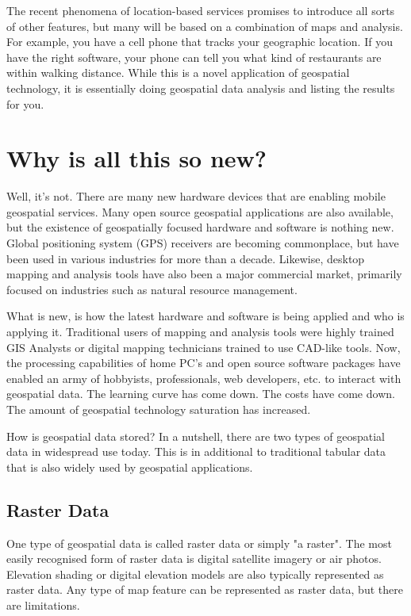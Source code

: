 The recent phenomena of location-based services promises to introduce all
sorts of other features, but many will be based on a combination of maps and
analysis. For example, you have a cell phone that tracks your geographic
location. If you have the right software, your phone can tell you what kind of
restaurants are within walking distance. While this is a novel application of
geospatial technology, it is essentially doing geospatial data analysis and
listing the results for you.

\section{Why is all this so new?}
Well, it's not. There are many new hardware devices that are enabling mobile
geospatial services. Many open source geospatial applications are also
available, but the existence of geospatially focused hardware and software is
nothing new. Global positioning system (GPS) receivers are becoming
commonplace, but have been used in various industries for more than a decade.
Likewise, desktop mapping and analysis tools have also been a major commercial
market, primarily focused on industries such as natural resource management.

What is new, is how the latest hardware and software is being applied and who
is applying it. Traditional users of mapping and analysis tools were highly
trained GIS Analysts or digital mapping technicians trained to use CAD-like
tools. Now, the processing capabilities of home PC's and open source software
packages have enabled an army of hobbyists, professionals, web developers,
etc. to interact with geospatial data. The learning curve has come down. The
costs have come down. The amount of geospatial technology saturation has
increased.

How is geospatial data stored?
In a nutshell, there are two types of geospatial data in widespread use today.
This is in additional to traditional tabular data that is also widely used by
geospatial applications.

\subsection{Raster Data}
One type of geospatial data is called raster data or simply "a raster". The
most easily recognised form of raster data is digital satellite imagery or air
photos. Elevation shading or digital elevation models are also typically
represented as raster data. Any type of map feature can be represented as
raster data, but there are limitations.

